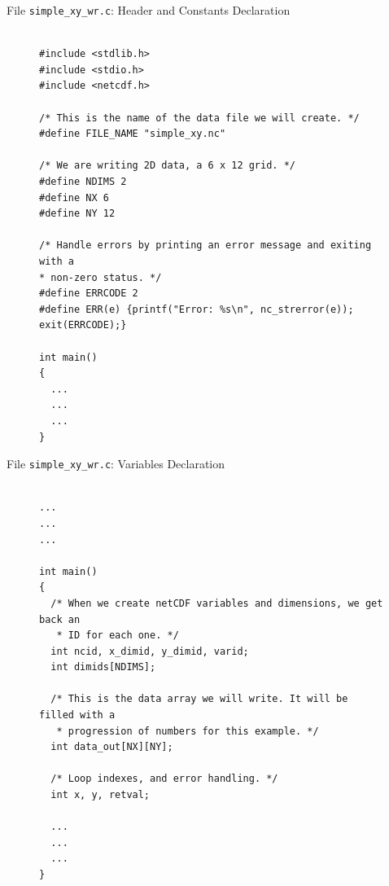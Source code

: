 \documentclass[compress,11pt,xcolor=svgnames,aspectratio=169]{beamer}
\begin{document}
\begin{frame}[fragile]{File \texttt{simple\_xy\_wr.c}: Header and Constants Declaration}

\begin{figure}
\centering
\begin{varwidth}{\linewidth}
{\tiny

\begin{verbatim}

#include <stdlib.h>
#include <stdio.h>
#include <netcdf.h>

/* This is the name of the data file we will create. */
#define FILE_NAME "simple_xy.nc"

/* We are writing 2D data, a 6 x 12 grid. */
#define NDIMS 2
#define NX 6
#define NY 12

/* Handle errors by printing an error message and exiting with a
* non-zero status. */
#define ERRCODE 2
#define ERR(e) {printf("Error: %s\n", nc_strerror(e)); exit(ERRCODE);}

int main()
{
  ...
  ...
  ...
}

\end{verbatim}

}
\end{varwidth}
\end{figure}

\end{frame}

\begin{frame}[fragile]{File \texttt{simple\_xy\_wr.c}: Variables Declaration}

\begin{figure}
\centering
\begin{varwidth}{\linewidth}
{\tiny

\begin{verbatim}

...
...
...

int main()
{
  /* When we create netCDF variables and dimensions, we get back an
   * ID for each one. */
  int ncid, x_dimid, y_dimid, varid;
  int dimids[NDIMS];

  /* This is the data array we will write. It will be filled with a
   * progression of numbers for this example. */
  int data_out[NX][NY];

  /* Loop indexes, and error handling. */
  int x, y, retval;

  ...
  ...
  ...
}

\end{verbatim}

}
\end{varwidth}
\end{figure}

\end{frame}
\end{document}
